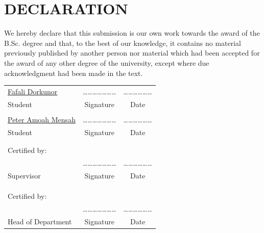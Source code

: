 \chapter*{DECLARATION}

We hereby declare that this submission is our own work towards the award of the B.Sc. degree and that, to the best of our knowledge, it contains no material previously published by another person nor material which had been accepted for the award of any other degree of the university, except where due acknowledgment had been made in the text.\\

\begin{center}
 \begin{tabular}{lcc}
 \underline{Fafali Dorkunor} &\quad\quad\quad \ldots\ldots\ldots\ldots\ldots\ldots\ldots &\quad\quad\quad \ldots\ldots\ldots\ldots\ldots\ldots \\
 Student &\quad\quad\quad Signature &\quad\quad\quad Date \\
 & & \\
 \underline{Peter Amoah Mensah} &\quad\quad\quad \ldots\ldots\ldots\ldots\ldots\ldots\ldots &\quad\quad\quad \ldots\ldots\ldots\ldots\ldots\ldots \\
 Student &\quad\quad\quad Signature &\quad\quad\quad Date \\
 & & \\
 & & \\
  Certified by: & &\\
 \underline{\hspace{4cm}} &\quad\quad\quad \ldots\ldots\ldots\ldots\ldots\ldots\ldots &\quad\quad\quad \ldots\ldots\ldots\ldots\ldots\ldots \\
 Supervisor &\quad\quad\quad Signature &\quad\quad\quad Date \\
 & & \\
 & & \\
 & & \\
 Certified by: & &\\
 \underline{\hspace{4cm}} &\quad\quad\quad \ldots\ldots\ldots\ldots\ldots\ldots\ldots &\quad\quad\quad \ldots\ldots\ldots\ldots\ldots\ldots \\
 Head of Department &\quad\quad\quad Signature &\quad\quad\quad Date
\end{tabular}
\end{center}